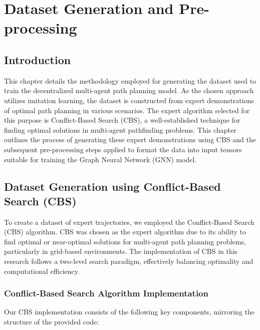 \chapter{Dataset Generation and Pre-processing}\label{chap:dataset}

\section{Introduction}

This chapter details the methodology employed for generating the dataset used to train the decentralized multi-agent path planning model. As the chosen approach utilizes imitation learning, the dataset is constructed from expert demonstrations of optimal path planning in various scenarios. The expert algorithm selected for this purpose is Conflict-Based Search (CBS), a well-established technique for finding optimal solutions in multi-agent pathfinding problems. This chapter outlines the process of generating these expert demonstrations using CBS and the subsequent pre-processing steps applied to format the data into input tensors suitable for training the Graph Neural Network (GNN) model.

\section{Dataset Generation using Conflict-Based Search (CBS)}

To create a dataset of expert trajectories, we employed the Conflict-Based Search (CBS) algorithm. CBS was chosen as the expert algorithm due to its ability to find optimal or near-optimal solutions for multi-agent path planning problems, particularly in grid-based environments. The implementation of CBS in this research follows a two-level search paradigm, effectively balancing optimality and computational efficiency.

\subsection{Conflict-Based Search Algorithm Implementation}

Our CBS implementation consists of the following key components, mirroring the structure of the provided code:

